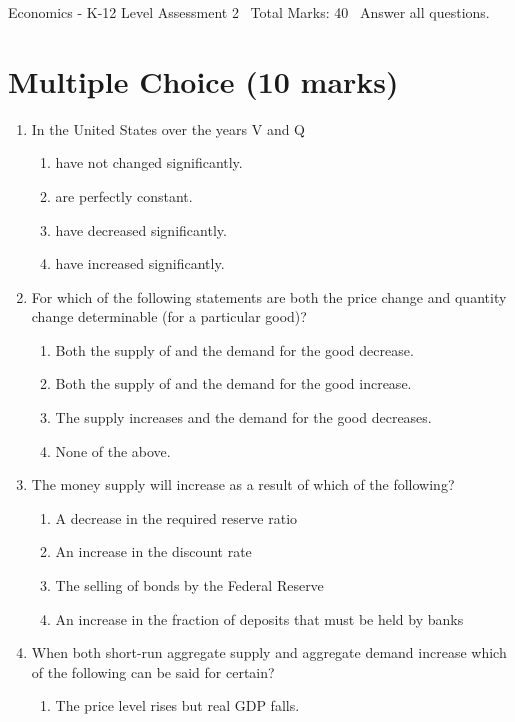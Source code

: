 \documentclass[12pt]{article}
\begin{document}
\begin{center}
Economics - K-12 Level Assessment 2 \
Total Marks: 40 \
Answer all questions.
\end{center}

\section*{Multiple Choice (10 marks)}
\begin{enumerate}[label=\arabic*.]
\item In the United States over the years V and Q
\begin{enumerate}[label=(\alph*)]
    \item have not changed significantly.
    \item are perfectly constant.
    \item have decreased significantly.
    \item have increased significantly.
\end{enumerate}
\item For which of the following statements are both the price change and quantity change determinable (for a particular good)?
\begin{enumerate}[label=(\alph*)]
    \item Both the supply of and the demand for the good decrease.
    \item Both the supply of and the demand for the good increase.
    \item The supply increases and the demand for the good decreases.
    \item None of the above.
\end{enumerate}
\item The money supply will increase as a result of which of the following?
\begin{enumerate}[label=(\alph*)]
    \item A decrease in the required reserve ratio
    \item An increase in the discount rate
    \item The selling of bonds by the Federal Reserve
    \item An increase in the fraction of deposits that must be held by banks
\end{enumerate}
\item When both short-run aggregate supply and aggregate demand increase which of the following can be said for certain?
\begin{enumerate}[label=(\alph*)]
    \item The price level rises but real GDP falls.

\end{enumerate}
\end{enumerate}
\end{document}
